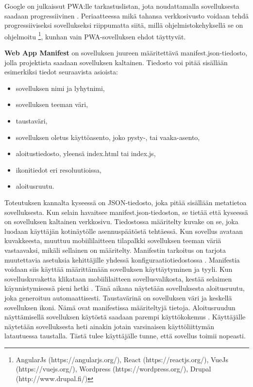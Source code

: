 \documentclass{tktltiki}
\begin{document}
Google on julkaissut PWA:lle tarkastuslistan, jota noudattamalla sovelluksesta saadaan progressiivinen \cite{Google}. Periaatteessa mikä tahansa verkkosivusto voidaan tehdä progressiiviseksi sovellukseksi \cite{hiltunen2018creating} riippumatta siitä, millä ohjelmistokehyksellä se on ohjelmoitu \footnote[1]{AngularJs (https://angularjs.org/), React (https://reactjs.org/), VueJs (https://vuejs.org/), Wordpress (https://wordpress.org/), Drupal (http://www.drupal.fi/)}, kunhan vain PWA-sovelluksen ehdot täyttyvät.

\textbf{Web App Manifest} on sovelluksen juureen määritettävä manifest.json-tiedosto, jolla projektista saadaan sovelluksen kaltainen. Tiedosto voi pitää sisällään esimerkiksi tiedot seuraavista asioista:

\begin{itemize}
  \item sovelluksen nimi ja lyhytnimi,
  \item sovelluksen teeman väri,
  \item taustaväri,
  \item sovelluksen oletus käyttöasento, joko pysty-, tai vaaka-asento,
  \item aloitustiedosto, yleensä index.html tai index.js,
  \item ikonitiedot eri resoluutioissa,
  \item aloitusruutu.
\end{itemize}

Toteutuksen kannalta kyseessä on JSON-tiedosto, joka pitää sisällään metatietoa sovelluksesta. Kun selain havaitsee manifest.json-tiedoston, se tietää että kyseessä on sovelluksen kaltainen verkkosivu. Tiedostossa määritelty kuvake on se, joka luodaan käyttäjän kotinäytölle asennuspäätöstä tehtäessä. Kun sovellus avataan kuvakkeesta, muuttuu mobiililaitteen tilapalkki sovelluksen teeman väriä vastaavaksi, mikäli sellainen on määritelty. Manifestin tarkoitus on tarjota muutettavia asetuksia kehittäjille yhdessä konfiguraatiotiedostossa \cite{biorn2017progressive}. Manifestia voidaan siis käyttää määrittämään sovelluksen käyttäytyminen ja tyyli.
Kun sovelluskuvaketta klikataan mobiililaitteen sovellusvalikosta, kestää selaimen käynnistymisessä pieni hetki \cite{hiltunen2018creating}. Tänä aikana näytetään sovelluksesta aloitusruutu, joka generoituu automaattisesti. Taustavärinä on sovelluksen väri ja keskellä sovelluksen ikoni. Nämä ovat manifestissa määriteltyjä tietoja. Aloitusruudun näyttämisellä sovelluksen käytöstä saadaan parempi käyttökokemus \cite{hiltunen2018creating}. Käyttäjälle näytetään sovelluksesta heti ainakin jotain varsinaisen käyttöliittymän latautuessa taustalla. Tästä tulee käyttäjälle tunne, että sovellus toimii nopeasti.
\end{document}
